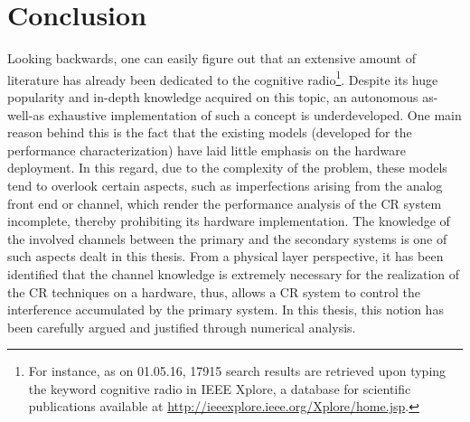 \chapter{Conclusion}
\label{chap:Con}

Looking backwards, one can easily figure out that an extensive amount of literature has already been dedicated to the cognitive radio\footnote{For instance, as on 01.05.16, 17915 search results are retrieved upon typing the keyword cognitive radio in IEEE Xplore, a database for scientific publications available at \url{http://ieeexplore.ieee.org/Xplore/home.jsp}.}. Despite its huge popularity and in-depth knowledge acquired on this topic, an autonomous as-well-as exhaustive implementation of such a concept is underdeveloped. One main reason behind this is the fact that the existing models (developed for the performance characterization) have laid little emphasis on the hardware deployment. In this regard, due to the complexity of the problem, these models tend to overlook certain aspects, such as imperfections arising from the analog front end or channel, which render the performance analysis of the CR system incomplete, thereby prohibiting its hardware implementation. The knowledge of the involved channels between the primary and the secondary systems is one of such aspects dealt in this thesis. 
From a physical layer perspective, it has been identified that the channel knowledge is extremely necessary for the realization of the CR techniques on a hardware, thus, allows a CR system to control the interference accumulated by the primary system. In this thesis, this notion has been carefully argued and justified through numerical analysis. %

